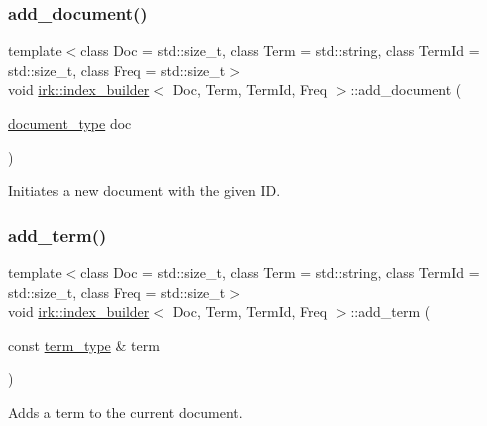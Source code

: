 \subsubsection{\texorpdfstring{add\+\_\+document()}{add\_document()}\hspace{0.1cm}{\footnotesize\ttfamily [2/2]}}
{\footnotesize\ttfamily template$<$class Doc  = std\+::size\+\_\+t, class Term  = std\+::string, class Term\+Id  = std\+::size\+\_\+t, class Freq  = std\+::size\+\_\+t$>$ \\
void \mbox{\hyperlink{classirk_1_1index__builder}{irk\+::index\+\_\+builder}}$<$ Doc, Term, Term\+Id, Freq $>$\+::add\+\_\+document (\begin{DoxyParamCaption}\item[{\mbox{\hyperlink{classirk_1_1index__builder_a4230ae91e9f84c95ee99b3607c6e952e}{document\+\_\+type}}}]{doc }\end{DoxyParamCaption})\hspace{0.3cm}{\ttfamily [inline]}}



Initiates a new document with the given ID. 

\mbox{\label{classirk_1_1index__builder_a73e03d40562487c47ed14f6d2412c7ca}} 
\subsubsection{\texorpdfstring{add\+\_\+term()}{add\_term()}}
{\footnotesize\ttfamily template$<$class Doc  = std\+::size\+\_\+t, class Term  = std\+::string, class Term\+Id  = std\+::size\+\_\+t, class Freq  = std\+::size\+\_\+t$>$ \\
void \mbox{\hyperlink{classirk_1_1index__builder}{irk\+::index\+\_\+builder}}$<$ Doc, Term, Term\+Id, Freq $>$\+::add\+\_\+term (\begin{DoxyParamCaption}\item[{const \mbox{\hyperlink{classirk_1_1index__builder_ad80a8f10f3e72ed3b9a2f181350f3f1f}{term\+\_\+type}} \&}]{term }\end{DoxyParamCaption})\hspace{0.3cm}{\ttfamily [inline]}}



Adds a term to the current document. 

